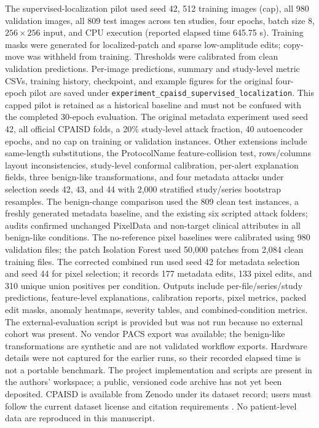 \documentclass[journal]{IEEEtran}
\begin{document}
  The supervised-localization pilot used seed 42, 512 training images (cap), all 980 validation images, all 809 test images across ten studies, four epochs, batch size 8, $256\times256$ input, and CPU execution (reported elapsed time 645.75 s). Training masks were generated for localized-patch and sparse low-amplitude edits; copy-move was withheld from training. Thresholds were calibrated from clean validation predictions. Per-image predictions, summary and study-level metric CSVs, training history, checkpoint, and example figures for the original four-epoch pilot are saved under \texttt{experiment\_cpaisd\_supervised\_localization}. This capped pilot is retained as a historical baseline and must not be confused with the completed 30-epoch evaluation. The original metadata experiment used seed 42, all official CPAISD folds, a 20\% study-level attack fraction, 40 autoencoder epochs, and no cap on training or validation instances. Other extensions include same-length substitutions, the ProtocolName feature-collision test, rows/columns layout inconsistencies, study-level conformal calibration, per-alert explanation fields, three benign-like transformations, and four metadata attacks under selection seeds 42, 43, and 44 with 2,000 stratified study/series bootstrap resamples. The benign-change comparison used the 809 clean test instances, a freshly generated metadata baseline, and the existing six scripted attack folders; audits confirmed unchanged PixelData and non-target clinical attributes in all benign-like conditions. The no-reference pixel baselines were calibrated using 980 validation files; the patch Isolation Forest used 50,000 patches from 2,084 clean training files. The corrected combined run used seed 42 for metadata selection and seed 44 for pixel selection; it records 177 metadata edits, 133 pixel edits, and 310 unique union positives per condition. Outputs include per-file/series/study predictions, feature-level explanations, calibration reports, pixel metrics, packed edit masks, anomaly heatmaps, severity tables, and combined-condition metrics. The external-evaluation script is provided but was not run because no external cohort was present. No vendor PACS export was available; the benign-like transformations are synthetic and are not validated workflow exports. Hardware details were not captured for the earlier runs, so their recorded elapsed time is not a portable benchmark. The project implementation and scripts are present in the authors' workspace; a public, versioned code archive has not yet been deposited. CPAISD is available from Zenodo under its dataset record; users must follow the current dataset license and citation requirements \cite{umerenkov2025,cpaisdzenodo}. No patient-level data are reproduced in this manuscript.
  
\end{document}
